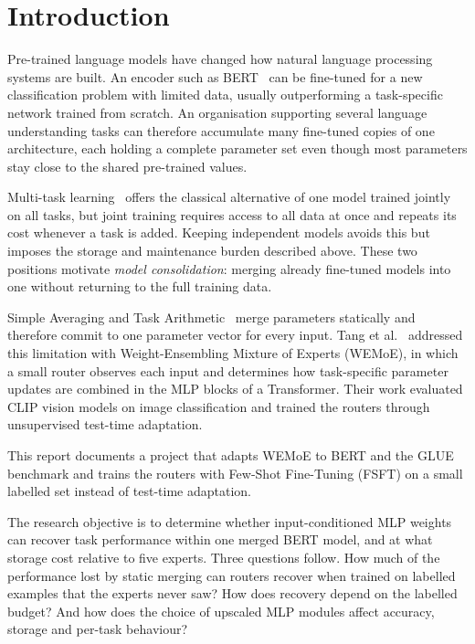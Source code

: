 \chapter{Introduction}

Pre-trained language models have changed how natural language processing systems are built. An encoder such as BERT~\cite{devlin2019bert} can be fine-tuned for a new classification problem with limited data, usually outperforming a task-specific network trained from scratch. An organisation supporting several language understanding tasks can therefore accumulate many fine-tuned copies of one architecture, each holding a complete parameter set even though most parameters stay close to the shared pre-trained values.

Multi-task learning~\cite{caruana1997multitask} offers the classical alternative of one model trained jointly on all tasks, but joint training requires access to all data at once and repeats its cost whenever a task is added. Keeping independent models avoids this but imposes the storage and maintenance burden described above. These two positions motivate \emph{model consolidation}: merging already fine-tuned models into one without returning to the full training data.

Simple Averaging and Task Arithmetic~\cite{ilharco2023task} merge parameters statically and therefore commit to one parameter vector for every input. Tang et al.~\cite{tang2024wemoe} addressed this limitation with Weight-Ensembling Mixture of Experts (WEMoE), in which a small router observes each input and determines how task-specific parameter updates are combined in the MLP blocks of a Transformer. Their work evaluated CLIP vision models on image classification and trained the routers through unsupervised test-time adaptation.

This report documents a project that adapts WEMoE to BERT and the GLUE benchmark and trains the routers with Few-Shot Fine-Tuning (FSFT) on a small labelled set instead of test-time adaptation.

The research objective is to determine whether input-conditioned MLP weights can recover task performance within one merged BERT model, and at what storage cost relative to five experts. Three questions follow. How much of the performance lost by static merging can routers recover when trained on labelled examples that the experts never saw? How does recovery depend on the labelled budget? And how does the choice of upscaled MLP modules affect accuracy, storage and per-task behaviour?

